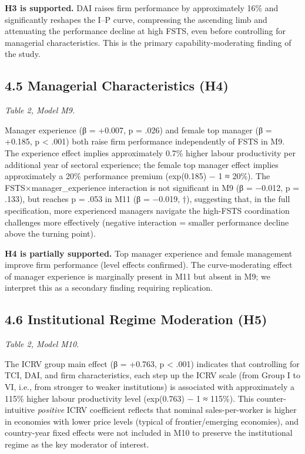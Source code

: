 \documentclass[
  12pt]{article}
\begin{document}
\textbf{H3 is supported.} DAI raises firm performance by approximately
16\% and significantly reshapes the I--P curve, compressing the
ascending limb and attenuating the performance decline at high FSTS,
even before controlling for managerial characteristics. This is the
primary capability-moderating finding of the study.

\hypertarget{managerial-characteristics-h4-1}{%
\subsection{4.5 Managerial Characteristics
(H4)}\label{managerial-characteristics-h4-1}}

\emph{Table 2, Model M9.}

Manager experience (β = +0.007, p = .026) and female top manager (β =
+0.185, p \textless{} .001) both raise firm performance independently of
FSTS in M9. The experience effect implies approximately 0.7\% higher
labour productivity per additional year of sectoral experience; the
female top manager effect implies approximately a 20\% performance
premium (exp(0.185) − 1 ≈ 20\%). The FSTS×manager\_experience
interaction is not significant in M9 (β = −0.012, p = .133), but reaches
p = .053 in M11 (β = −0.019, †), suggesting that, in the full
specification, more experienced managers navigate the high-FSTS
coordination challenges more effectively (negative interaction = smaller
performance decline above the turning point).

\textbf{H4 is partially supported.} Top manager experience and female
management improve firm performance (level effects confirmed). The
curve-moderating effect of manager experience is marginally present in
M11 but absent in M9; we interpret this as a secondary finding requiring
replication.

\hypertarget{institutional-regime-moderation-h5}{%
\subsection{4.6 Institutional Regime Moderation
(H5)}\label{institutional-regime-moderation-h5}}

\emph{Table 2, Model M10.}

The ICRV group main effect (β = +0.763, p \textless{} .001) indicates
that controlling for TCI, DAI, and firm characteristics, each step up
the ICRV scale (from Group I to VI, i.e., from stronger to weaker
institutions) is associated with approximately a 115\% higher labour
productivity level (exp(0.763) − 1 ≈ 115\%). This counter-intuitive
\emph{positive} ICRV coefficient reflects that nominal sales-per-worker
is higher in economies with lower price levels (typical of
frontier/emerging economies), and country-year fixed effects were not
included in M10 to preserve the institutional regime as the key
moderator of interest.
\end{document}
